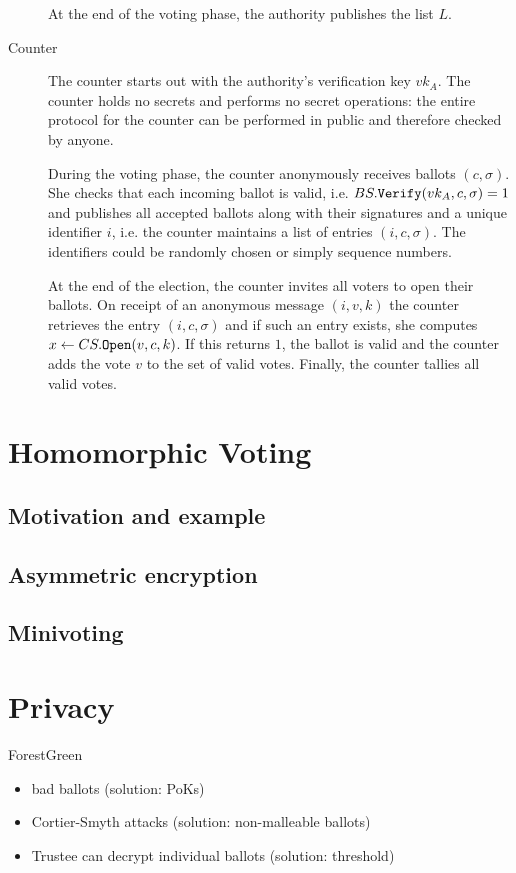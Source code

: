 \documentclass{llncs}
\newenvironment{structure}{
  \begin{color}{ForestGreen}
}{
  \end{color}
}
\newcommand{\alg}[1]{\textup{\texttt{#1}}}
\begin{document}
\begin{description}
At the end of the voting phase, the authority publishes the list $L$.

\item[Counter]
The counter starts out with the authority's verification key $vk_A$.
The counter holds no secrets and performs no secret operations: the entire
protocol for the counter can be performed in public and therefore checked by
anyone.

During the voting phase, the counter anonymously receives ballots $(c, \sigma)$.
She checks that each incoming ballot is valid, i.e. $BS.\alg{Verify}(vk_A, c,
\sigma) = 1$ and publishes all accepted ballots along with their signatures and
a unique identifier $i$, i.e. the counter maintains a list of entries $(i, c,
\sigma)$. The identifiers could be randomly chosen or simply sequence numbers.

At the end of the election, the counter invites all voters to open their
ballots. On receipt of an anonymous message $(i, v, k)$ the counter retrieves
the entry $(i, c, \sigma)$ and if such an entry exists, she computes $x \gets
CS.\alg{Open}(v, c, k)$. If this returns $1$, the ballot is valid and the
counter adds the vote $v$ to the set of valid votes. Finally, the counter
tallies all valid votes.
\end{description}

\section{Homomorphic Voting}

\subsection{Motivation and example}

\subsection{Asymmetric encryption}

\subsection{Minivoting}

\section{Privacy}

\begin{structure}
\begin{itemize}
\item bad ballots (solution: PoKs)
\item Cortier-Smyth attacks (solution: non-malleable ballots)
\item Trustee can decrypt individual ballots (solution: threshold)
\end{itemize}
\end{structure}
\end{document}
